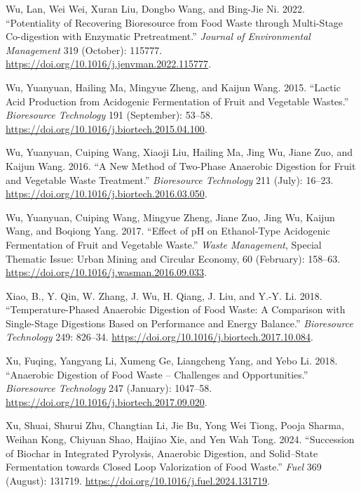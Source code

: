\documentclass[11pt]{report}
\begin{document}
\begin{hangparas}{1.5em}{1}
\hypertarget{citeproc_bib_item_86}{Wu, Lan, Wei Wei, Xuran Liu, Dongbo Wang, and Bing-Jie Ni. 2022. “Potentiality of Recovering Bioresource from Food Waste through Multi-Stage Co-digestion with Enzymatic Pretreatment.” \textit{Journal of Environmental Management} 319 (October): 115777. \url{https://doi.org/10.1016/j.jenvman.2022.115777}.}

\hypertarget{citeproc_bib_item_87}{Wu, Yuanyuan, Hailing Ma, Mingyue Zheng, and Kaijun Wang. 2015. “Lactic Acid Production from Acidogenic Fermentation of Fruit and Vegetable Wastes.” \textit{Bioresource Technology} 191 (September): 53–58. \url{https://doi.org/10.1016/j.biortech.2015.04.100}.}

\hypertarget{citeproc_bib_item_88}{Wu, Yuanyuan, Cuiping Wang, Xiaoji Liu, Hailing Ma, Jing Wu, Jiane Zuo, and Kaijun Wang. 2016. “A New Method of Two-Phase Anaerobic Digestion for Fruit and Vegetable Waste Treatment.” \textit{Bioresource Technology} 211 (July): 16–23. \url{https://doi.org/10.1016/j.biortech.2016.03.050}.}

\hypertarget{citeproc_bib_item_89}{Wu, Yuanyuan, Cuiping Wang, Mingyue Zheng, Jiane Zuo, Jing Wu, Kaijun Wang, and Boqiong Yang. 2017. “Effect of pH on Ethanol-Type Acidogenic Fermentation of Fruit and Vegetable Waste.” \textit{Waste Management}, Special Thematic Issue: Urban Mining and Circular Economy, 60 (February): 158–63. \url{https://doi.org/10.1016/j.wasman.2016.09.033}.}

\hypertarget{citeproc_bib_item_90}{Xiao, B., Y. Qin, W. Zhang, J. Wu, H. Qiang, J. Liu, and Y.-Y. Li. 2018. “Temperature-Phased Anaerobic Digestion of Food Waste: A Comparison with Single-Stage Digestions Based on Performance and Energy Balance.” \textit{Bioresource Technology} 249: 826–34. \url{https://doi.org/10.1016/j.biortech.2017.10.084}.}

\hypertarget{citeproc_bib_item_91}{Xu, Fuqing, Yangyang Li, Xumeng Ge, Liangcheng Yang, and Yebo Li. 2018. “Anaerobic Digestion of Food Waste – Challenges and Opportunities.” \textit{Bioresource Technology} 247 (January): 1047–58. \url{https://doi.org/10.1016/j.biortech.2017.09.020}.}

\hypertarget{citeproc_bib_item_92}{Xu, Shuai, Shurui Zhu, Changtian Li, Jie Bu, Yong Wei Tiong, Pooja Sharma, Weihan Kong, Chiyuan Shao, Haijiao Xie, and Yen Wah Tong. 2024. “Succession of Biochar in Integrated Pyrolysis, Anaerobic Digestion, and Solid–State Fermentation towards Closed Loop Valorization of Food Waste.” \textit{Fuel} 369 (August): 131719. \url{https://doi.org/10.1016/j.fuel.2024.131719}.}


\end{hangparas}
\end{document}
